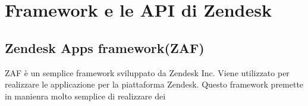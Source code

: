 \section{Framework e le API di Zendesk}

\subsection{Zendesk Apps framework(ZAF)}
ZAF è un semplice framework sviluppato da Zendesk Inc. Viene utilizzato per realizzare le applicazione per la piattaforma Zendesk. Questo framework premette in manienra molto semplice di realizzare dei


